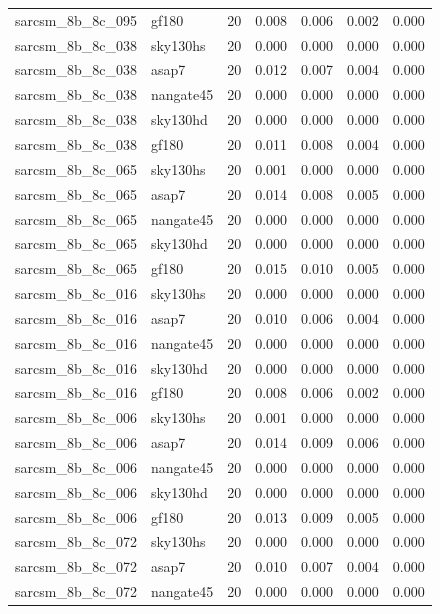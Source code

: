 \begin{tabular}{llrrrrr}
sarcsm\_8b\_8c\_095 & gf180 & 20 & 0.008 & 0.006 & 0.002 & 0.000 \\
sarcsm\_8b\_8c\_038 & sky130hs & 20 & 0.000 & 0.000 & 0.000 & 0.000 \\
sarcsm\_8b\_8c\_038 & asap7 & 20 & 0.012 & 0.007 & 0.004 & 0.000 \\
sarcsm\_8b\_8c\_038 & nangate45 & 20 & 0.000 & 0.000 & 0.000 & 0.000 \\
sarcsm\_8b\_8c\_038 & sky130hd & 20 & 0.000 & 0.000 & 0.000 & 0.000 \\
sarcsm\_8b\_8c\_038 & gf180 & 20 & 0.011 & 0.008 & 0.004 & 0.000 \\
sarcsm\_8b\_8c\_065 & sky130hs & 20 & 0.001 & 0.000 & 0.000 & 0.000 \\
sarcsm\_8b\_8c\_065 & asap7 & 20 & 0.014 & 0.008 & 0.005 & 0.000 \\
sarcsm\_8b\_8c\_065 & nangate45 & 20 & 0.000 & 0.000 & 0.000 & 0.000 \\
sarcsm\_8b\_8c\_065 & sky130hd & 20 & 0.000 & 0.000 & 0.000 & 0.000 \\
sarcsm\_8b\_8c\_065 & gf180 & 20 & 0.015 & 0.010 & 0.005 & 0.000 \\
sarcsm\_8b\_8c\_016 & sky130hs & 20 & 0.000 & 0.000 & 0.000 & 0.000 \\
sarcsm\_8b\_8c\_016 & asap7 & 20 & 0.010 & 0.006 & 0.004 & 0.000 \\
sarcsm\_8b\_8c\_016 & nangate45 & 20 & 0.000 & 0.000 & 0.000 & 0.000 \\
sarcsm\_8b\_8c\_016 & sky130hd & 20 & 0.000 & 0.000 & 0.000 & 0.000 \\
sarcsm\_8b\_8c\_016 & gf180 & 20 & 0.008 & 0.006 & 0.002 & 0.000 \\
sarcsm\_8b\_8c\_006 & sky130hs & 20 & 0.001 & 0.000 & 0.000 & 0.000 \\
sarcsm\_8b\_8c\_006 & asap7 & 20 & 0.014 & 0.009 & 0.006 & 0.000 \\
sarcsm\_8b\_8c\_006 & nangate45 & 20 & 0.000 & 0.000 & 0.000 & 0.000 \\
sarcsm\_8b\_8c\_006 & sky130hd & 20 & 0.000 & 0.000 & 0.000 & 0.000 \\
sarcsm\_8b\_8c\_006 & gf180 & 20 & 0.013 & 0.009 & 0.005 & 0.000 \\
sarcsm\_8b\_8c\_072 & sky130hs & 20 & 0.000 & 0.000 & 0.000 & 0.000 \\
sarcsm\_8b\_8c\_072 & asap7 & 20 & 0.010 & 0.007 & 0.004 & 0.000 \\
sarcsm\_8b\_8c\_072 & nangate45 & 20 & 0.000 & 0.000 & 0.000 & 0.000 \\

\end{tabular}
